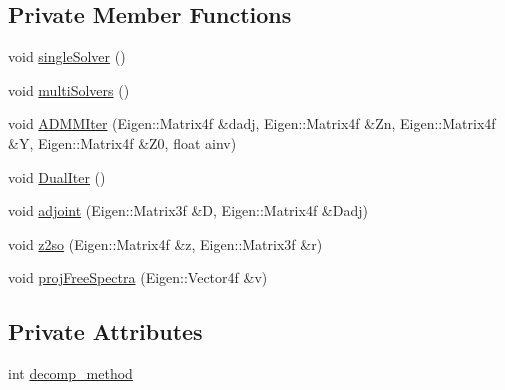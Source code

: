 \subsection*{\-Private \-Member \-Functions}
\begin{DoxyCompactItemize}
\item 
void \hyperlink{classSolvePoseAnalytic_a1bd5ff12daa4146f5ce418391cb03c7c}{single\-Solver} ()
\item 
void \hyperlink{classSolvePoseAnalytic_aea9b5c0833af7633f80b8879b26b4c99}{multi\-Solvers} ()
\item 
void \hyperlink{classSolvePoseAnalytic_afdb3d837111ffdfb4fe5821dc6b6165b}{\-A\-D\-M\-M\-Iter} (\-Eigen\-::\-Matrix4f \&dadj, \-Eigen\-::\-Matrix4f \&\-Zn, \-Eigen\-::\-Matrix4f \&\-Y, \-Eigen\-::\-Matrix4f \&\-Z0, float ainv)
\item 
void \hyperlink{classSolvePoseAnalytic_a477b3c908bc27e07c80ec117a6cfd8d9}{\-Dual\-Iter} ()
\item 
void \hyperlink{classSolvePoseAnalytic_a51160b660f01b388d8e535b00f54336e}{adjoint} (\-Eigen\-::\-Matrix3f \&\-D, \-Eigen\-::\-Matrix4f \&\-Dadj)
\item 
void \hyperlink{classSolvePoseAnalytic_a5c756fab3a0a31c6f6c02d0a9a0cf62a}{z2so} (\-Eigen\-::\-Matrix4f \&z, \-Eigen\-::\-Matrix3f \&r)
\item 
void \hyperlink{classSolvePoseAnalytic_addd843afaa4ce7e35826f100d46e3699}{proj\-Free\-Spectra} (\-Eigen\-::\-Vector4f \&v)
\end{DoxyCompactItemize}
\subsection*{\-Private \-Attributes}
\begin{DoxyCompactItemize}
\item 
int \hyperlink{classSolvePoseAnalytic_ae2c640a9416555bb83e8ffbc39e48a0c}{decomp\-\_\-method}
\end{DoxyCompactItemize}


